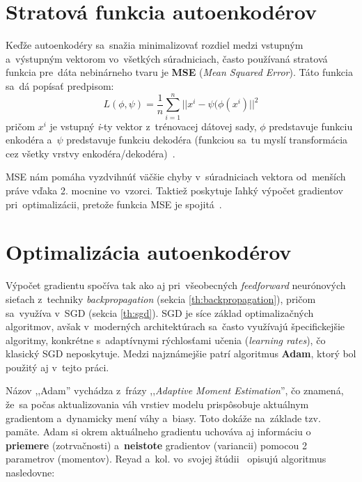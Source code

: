\section{Stratová funkcia autoenkodérov}\label{th:MSE}
Keďže autoenkodéry sa~snažia minimalizovať rozdiel medzi vstupným a~výstupným vektorom vo~všetkých súradniciach, často používaná stratová funkcia pre~dáta nebinárneho tvaru je \textbf{MSE} (\textit{Mean Squared Error}). Táto funkcia sa~dá popísať predpisom:
\begin{equation}
    L(\phi,\psi) = \frac{1}{n} \sum^n_{i=1}||x^i - \psi(\phi(x^i)||^2
\end{equation}
pričom $x^i$ je vstupný \textit{i}-ty vektor z~trénovacej dátovej sady, $\phi$ predstavuje funkciu enkodéra a~$\psi$ predstavuje funkciu dekodéra (funkciou sa~tu myslí transformácia cez všetky vrstvy enkodéra/dekodéra)~\cite{mienye2025deep}.

MSE nám pomáha vyzdvihnúť väčšie chyby v~súradniciach vektora od~menších práve vďaka 2. mocnine vo~vzorci. Taktiež poskytuje ľahký výpočet gradientov pri~optimalizácii, pretože funkcia MSE je spojitá~\cite{Goodfellow-et-al-2016}.



\section{Optimalizácia autoenkodérov}
Výpočet gradientu spočíva tak ako aj pri~všeobecných \textit{feedforward} neurónových sieťach z~techniky \textit{backpropagation} (sekcia \ref{th:backpropagation}), pričom sa~využíva v~SGD (sekcia \ref{th:sgd}). SGD je síce základ optimalizačných algoritmov, avšak v~moderných architektúrach sa~často využívajú špecifickejšie algoritmy, konkrétne s~adaptívnymi rýchlosťami učenia (\textit{learning rates}), čo klasický SGD neposkytuje. Medzi najznámejšie patrí algoritmus \textbf{Adam}\label{th:Adam}, ktorý bol použitý aj v~tejto práci.

Názov ,,Adam'' vychádza z~frázy ,,\textit{Adaptive Moment Estimation}'', čo znamená, že~sa počas aktualizovania váh vrstiev modelu prispôsobuje aktuálnym gradientom a~dynamicky mení váhy a~biasy. Toto dokáže na~základe tzv. pamäte. Adam si okrem aktuálneho gradientu uchováva aj informáciu o \textbf{priemere} (zotrvačnosti) a~\textbf{neistote} gradientov (variancii) pomocou 2 parametrov (momentov). Reyad a~kol. vo~svojej štúdii~\cite{reyad2023modified} opisujú algoritmus nasledovne:

